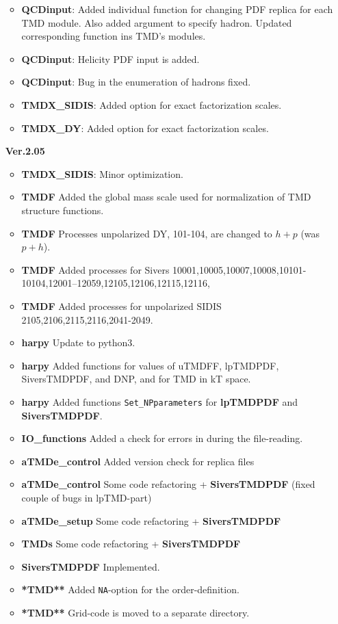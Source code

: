 \documentclass[prd,nofootinbib,eqsecnum,final]{revtex4}
\renewcommand{\(}{\left(}
\renewcommand{\)}{\right)}
\renewcommand{\[}{\left[}
\renewcommand{\]}{\right]}
\begin{document}
\begin{itemize}
\begin{itemize}
	\item \textbf{QCDinput}: Added individual function for changing PDF replica for each TMD module. Also added argument to specify hadron. Updated corresponding function ins TMD's modules.
	\item \textbf{QCDinput}: Helicity PDF input is added.
	\item \textbf{QCDinput}: Bug in the enumeration of hadrons fixed.
	\item \textbf{TMDX\_SIDIS}: Added option for exact factorization scales.
	\item \textbf{TMDX\_DY}: Added option for exact factorization scales.
\end{itemize}

\item[\textbf{Ver.2.05}]
\begin{itemize}
	\item \textbf{TMDX\_SIDIS}: Minor optimization.
	\item \textbf{TMDF} Added the global mass scale used for normalization of TMD structure functions.
	\item \textbf{TMDF} Processes unpolarized DY, 101-104, are changed to $h+p$ (was $p+h$).
	\item \textbf{TMDF} Added processes for Sivers 10001,10005,10007,10008,10101-10104,12001--12059,12105,12106,12115,12116,
	\item \textbf{TMDF} Added processes for unpolarized SIDIS 2105,2106,2115,2116,2041-2049.
	\item \textbf{harpy} Update to python3.
	\item \textbf{harpy} Added functions for values of uTMDFF, lpTMDPDF, SiversTMDPDF, and DNP, and for TMD in kT space.
	\item \textbf{harpy} Added functions \texttt{Set\_NPparameters} for \textbf{lpTMDPDF} and \textbf{SiversTMDPDF}.
	\item \textbf{IO\_functions} Added a check for errors in during the file-reading.
	\item \textbf{aTMDe\_control} Added version check for replica files
	\item \textbf{aTMDe\_control} Some code refactoring + \textbf{SiversTMDPDF} (fixed couple of bugs in lpTMD-part)
	\item \textbf{aTMDe\_setup} Some code refactoring + \textbf{SiversTMDPDF}
	\item \textbf{TMDs} Some code refactoring + \textbf{SiversTMDPDF}
	\item \textbf{SiversTMDPDF} Implemented.
	\item \textbf{*TMD**} Added \texttt{NA}-option for the order-definition.
	\item \textbf{*TMD**} Grid-code is moved to a separate directory.
\end{itemize}


\end{itemize}
\end{document}
